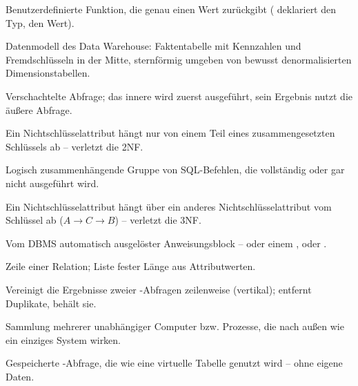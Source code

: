 \begin{description}[style=nextline, itemsep=2pt]
  \item[Skalarfunktion] Benutzerdefinierte Funktion, die genau einen Wert zurückgibt ( deklariert den Typ,  den Wert).
  \item[Star-Schema] Datenmodell des Data Warehouse: Faktentabelle mit Kennzahlen und Fremdschlüsseln in der Mitte, sternförmig umgeben von bewusst denormalisierten Dimensionstabellen.
  \item[Subselect] Verschachtelte Abfrage; das innere  wird zuerst ausgeführt, sein Ergebnis nutzt die äußere Abfrage.
  \item[Teilabhängigkeit] Ein Nichtschlüsselattribut hängt nur von einem Teil eines zusammengesetzten Schlüssels ab -- verletzt die 2NF.
  \item[Transaktion] Logisch zusammenhängende Gruppe von SQL-Befehlen, die vollständig oder gar nicht ausgeführt wird.
  \item[Transitive Abhängigkeit] Ein Nichtschlüsselattribut hängt über ein anderes Nichtschlüsselattribut vom Schlüssel ab ($A \rightarrow C \rightarrow B$) -- verletzt die 3NF.
  \item[Trigger] Vom DBMS automatisch ausgelöster Anweisungsblock --  oder  einem ,  oder .
  \item[Tupel] Zeile einer Relation; Liste fester Länge aus Attributwerten.
  \item[UNION] Vereinigt die Ergebnisse zweier -Abfragen zeilenweise (vertikal); entfernt Duplikate,  behält sie.
  \item[Verteiltes System] Sammlung mehrerer unabhängiger Computer bzw. Prozesse, die nach außen wie ein einziges System wirken.
  \item[View] Gespeicherte -Abfrage, die wie eine virtuelle Tabelle genutzt wird -- ohne eigene Daten.
\end{description}
